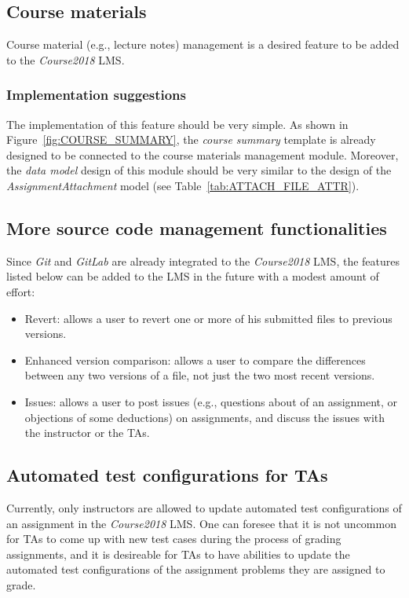 \subsection{Course materials}
Course material (e.g., lecture notes) management is a desired feature to be
added to the \emph{Course2018} LMS.

\subsubsection{Implementation suggestions}
The implementation of this feature should be very simple.
As shown in
Figure~\ref{fig:COURSE_SUMMARY}, the \emph{course summary} template is already
designed to be connected to the course materials management module.
Moreover, the \emph{data model} design of this module should
be very similar to the design of the \emph{AssignmentAttachment} model 
(see Table~\ref{tab:ATTACH_FILE_ATTR}).

\subsection{More source code management functionalities}
Since \emph{Git} and \emph{GitLab} are already integrated to the
\emph{Course2018} LMS, the features listed below can be added to the LMS in the
future with a modest amount of effort:
\begin{itemize}
    \item Revert: allows a user to revert one or more of his submitted files to
        previous versions.
    \item Enhanced version comparison: allows a user to compare the differences
        between any two versions of a file, not just the two most recent
        versions.
    \item Issues: allows a user to post issues (e.g., questions about of an
        assignment, or objections of some deductions) on assignments, and
        discuss the issues with the instructor or the TAs.
\end{itemize}

\subsection{Automated test configurations for TAs}
Currently, only instructors are allowed to update automated test
configurations of an assignment in the \emph{Course2018} LMS.
One can foresee that it is not uncommon for TAs to come up with new test
cases during the process of grading assignments, and it is desireable for TAs
to have abilities to update the automated test configurations of the assignment
problems they are assigned to grade.

